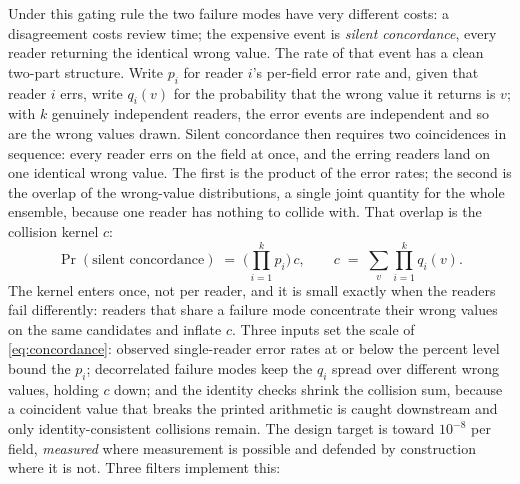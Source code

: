 \documentclass[11pt]{article}
\begin{document}
Under this gating rule the two failure modes have very different costs: a disagreement costs review time; the expensive event is \emph{silent concordance}, every reader returning the identical wrong value. The rate of that event has a clean two-part structure. Write $p_i$ for reader $i$'s per-field error rate and, given that reader $i$ errs, write $q_i(v)$ for the probability that the wrong value it returns is $v$; with $k$ genuinely independent readers, the error events are independent and so are the wrong values drawn. Silent concordance then requires two coincidences in sequence: every reader errs on the field at once, and the erring readers land on one identical wrong value. The first is the product of the error rates; the second is the overlap of the wrong-value distributions, a single joint quantity for the whole ensemble, because one reader has nothing to collide with. That overlap is the collision kernel $c$:
\begin{equation}
\Pr(\text{silent concordance}) \;=\; \Big(\prod_{i=1}^{k} p_i\Big)\, c,
\qquad
c \;=\; \sum_{v} \prod_{i=1}^{k} q_i(v).
\label{eq:concordance}
\end{equation}
The kernel enters once, not per reader, and it is small exactly when the readers fail differently: readers that share a failure mode concentrate their wrong values on the same candidates and inflate $c$. Three inputs set the scale of \eqref{eq:concordance}: observed single-reader error rates at or below the percent level bound the $p_i$; decorrelated failure modes keep the $q_i$ spread over different wrong values, holding $c$ down; and the identity checks shrink the collision sum, because a coincident value that breaks the printed arithmetic is caught downstream and only identity-consistent collisions remain. The design target is toward $10^{-8}$ per field, \emph{measured} where measurement is possible and defended by construction where it is not. Three filters implement this:
\end{document}
